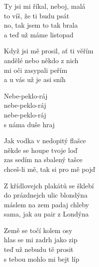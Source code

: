 \ve{}
Ty jsi mi říkal, neboj, malá\\
to víš, že ti budu psát\\
no, tak jsem to tak brala\\
a teď už máme listopad

Když jsi mě prosil, ať ti věřím\\
andělé nebo někdo z nich\\
mi oči zasypali peřím\\
a u vás už je asi sníh

\cho{}
Nebe-peklo-ráj\\
nebe-peklo-ráj\\
nebe-peklo-ráj\\
s náma duše hraj

\ve{}
Jak vodka v nedopitý flašce\\
někde se houpe tvoje loď\\
zas sedím na sbalený tašce\\
chceš-li mě, tak si pro mě pojď

\cho{}

\ve{}
Z křídlovejch plakátů se šklebí\\
do prázdnejch ulic blondýna\\
máslem na zem padaj chleby\\
sama, jak au pair z Londýna

Země se točí kolem osy\\
hlas se mi zadrh jako zip\\
teď už nebudu tě prosit\\
s tebou mohlo mi bejt líp

\cho{}

\esong{}